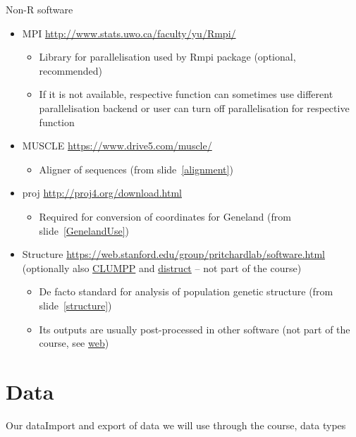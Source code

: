 \documentclass[compress, ucs, xelatex, 11pt, xcolor=svgnames,
  hyperref={
    bookmarks=true,
    unicode=true,
    colorlinks=true,
    pdftitle={Molecular data in R},
    plainpages=false,
    pdfauthor={Vojtech Zeisek},
    pdfsubject={Course about phylogeny and evolution in R},
    pdfcreator={XeLaTeX},
    pdfkeywords={R, evolution, phylogeny, molecular data},
    linkcolor=Tomato,
    anchorcolor=SaddleBrown,
    citecolor=Goldenrod,
    filecolor=DarkMagenta,
    menucolor=Sienna,
    urlcolor=DarkTurquoise,
    pdftex},
  url={hyphens, lowtilde} %
  ]{beamer}
\begin{document}
\begin{frame}[allowframebreaks]{Non-R software}
\begin{itemize}
\begin{itemize}
    \end{itemize}
    \item MPI \url{http://www.stats.uwo.ca/faculty/yu/Rmpi/}
    \begin{itemize}
      \item Library for parallelisation used by Rmpi package (optional, recommended)
      \item If it is not available, respective function can sometimes use different parallelisation backend or user can turn off parallelisation for respective function
    \end{itemize}
    \item MUSCLE \url{https://www.drive5.com/muscle/}
    \begin{itemize}
      \item Aligner of sequences (from slide~\ref{alignment})
    \end{itemize}
    \item proj \url{http://proj4.org/download.html}
    \begin{itemize}
      \item Required for conversion of coordinates for Geneland (from slide~\ref{GenelandUse})
    \end{itemize}
    \item Structure \url{https://web.stanford.edu/group/pritchardlab/software.html} (optionally also \href{https://web.stanford.edu/group/rosenberglab/clumpp.html}{CLUMPP} and \href{https://web.stanford.edu/group/rosenberglab/distruct.html}{distruct} -- not part of the course)
    \begin{itemize}
      \item De facto standard for analysis of population genetic structure (from slide~\ref{structure})
      \item Its outputs are usually post-processed in other software (not part of the course, see \href{https://trapa.cz/en/structure-r-linux}{web})
    \end{itemize}
  \end{itemize}
\end{frame}

\section{Data}

\begin{frame}{Our data}{Import and export of data we will use through the course, data types}
  \tableofcontents[currentsection, sectionstyle=show/hide, hideothersubsections]
\end{frame}
\end{document}
